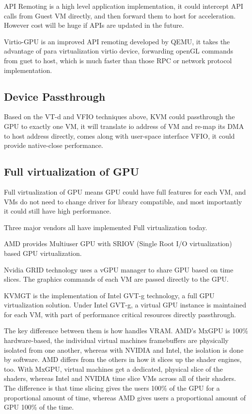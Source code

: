 \documentclass[a4paper,12pt]{article}
\begin{document}
API Remoting is a high level application implementation, it could intercept API calls from Guest VM directly, and then forward them to host for acceleration. However cost will be huge if APIs are updated in the future. 

Virtio-GPU is an improved API remoting developed by QEMU, it takes the advantage of para virtualization virtio device, forwarding openGL commands from guet to host, which is much faster than those RPC or network protocol implementation.    

\subsection{Device Passthrough}

Based on the VT-d and VFIO techniques above, KVM could passthrough the GPU to exactly one VM, it will translate io address of VM  and re-map its DMA to host address directly, comes along with user-space interface VFIO, it could provide native-close performance.   

\subsection{Full virtualization of GPU}

Full virtualization of GPU means GPU could have full features for each VM, and VMs do not need to change driver for library compatible, and most importantly it could still have high performance. 

Three major vendors all have implemented Full virtualization today.

AMD provides Multiuser GPU with SRIOV (Single Root I/O virtualization) based GPU virtualization.

Nvidia GRID technology uses a vGPU manager to share GPU based on time slices. The graphics commands of each VM are passed directly to the GPU. 

KVMGT is the implementation of Intel GVT-g technology, a full GPU virtualization solution. Under Intel GVT-g, a virtual GPU instance is maintained for each VM, with part of performance critical resources directly passthrough. 

The key difference between them is how handles VRAM. AMD’s MxGPU is 100\% hardware-based, the individual virtual machines framebuffers are physically isolated from one another, whereas with NVIDIA and Intel, the isolation is done by software. AMD differs from the others in how it slices up the shader engines, too. With MxGPU, virtual machines get a dedicated, physical slice of the shaders, whereas Intel and NVIDIA time slice VMs across all of their shaders. The difference is that time slicing gives the users 100\% of the GPU for a proportional amount of time, whereas AMD gives users a proportional amount of GPU 100\% of the time.
\end{document}
